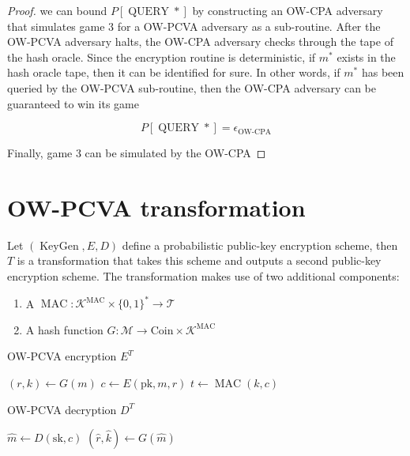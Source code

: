 \documentclass{article}
\newcommand{\keygen}{\operatorname{KeyGen}}
\begin{document}
\begin{proof}
    we can bound $P[\operatorname{QUERY}\ast]$ by constructing an OW-CPA adversary that simulates game 3 for a OW-PCVA adversary as a sub-routine. After the OW-PCVA adversary halts, the OW-CPA adversary checks through the tape of the hash oracle. Since the encryption routine is deterministic, if $m^\ast$ exists in the hash oracle tape, then it can be identified for sure. In other words, if $m^\ast$ has been queried by the OW-PCVA sub-routine, then the OW-CPA adversary can be guaranteed to win its game

    \begin{equation*}
        P[\operatorname{QUERY}\ast] = \epsilon_\text{OW-CPA}
    \end{equation*}

    Finally, game 3 can be simulated by the OW-CPA 

\end{proof}

\section{OW-PCVA transformation}
Let $(\keygen, E, D)$ define a probabilistic public-key encryption scheme, then $T$ is a transformation that takes this scheme and outputs a second public-key encryption scheme. The transformation makes use of two additional components:

\begin{enumerate}
    \item A $\operatorname{MAC}: \mathcal{K}^\text{MAC} \times \{0,1\}^\ast \rightarrow \mathcal{T}$
    \item A hash function $G: \mathcal{M} \rightarrow \text{Coin} \times \mathcal{K}^\text{MAC}$
\end{enumerate}

\begin{multicols}{2}
    \begin{algorithm}[H]
        \SetAlgoLined
        \caption{OW-PCVA encryption $E^T$}
        $(r, k) \leftarrow G(m)$\;
        $c \leftarrow E(\text{pk}, m, r)$\;
        $t \leftarrow \operatorname{MAC}(k, c)$
        \;
        \;
    \end{algorithm}

    \columnbreak

    \begin{algorithm}[H]
        \SetAlgoLined
        \caption{OW-PCVA decryption $D^T$}
        $\hat{m} \leftarrow D(\text{sk}, c)$\;
        $(\hat{r}, \hat{k}) \leftarrow G(\hat{m})$\;
        \;
    \end{algorithm}
\end{multicols}
\end{document}
